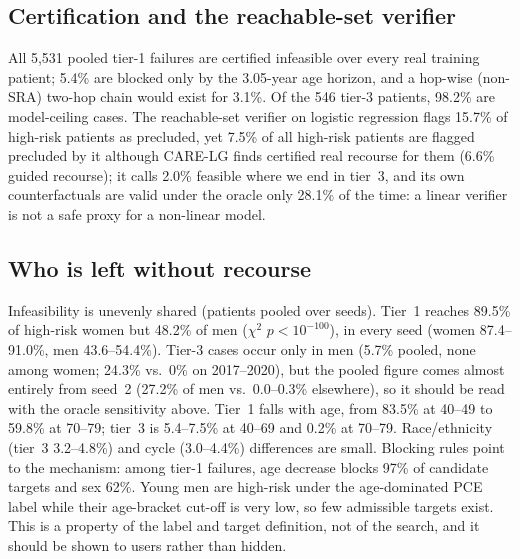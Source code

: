 \documentclass[conference]{IEEEtran}
\newcommand{\method}{CARE-LG}
\begin{document}
\subsection{Certification and the reachable-set verifier}
All 5,531 pooled tier-1 failures are certified infeasible over every real training patient; 5.4\% are blocked only by the 3.05-year age horizon, and a hop-wise (non-SRA) two-hop chain would exist for 3.1\%. Of the 546 tier-3 patients, 98.2\% are model-ceiling cases. The reachable-set verifier on logistic regression flags 15.7\% of high-risk patients as precluded, yet 7.5\% of all high-risk patients are flagged precluded by it although \method{} finds certified real recourse for them (6.6\% guided recourse); it calls 2.0\% feasible where we end in tier~3, and its own counterfactuals are valid under the oracle only 28.1\% of the time: a linear verifier is not a safe proxy for a non-linear model. %

\subsection{Who is left without recourse}
Infeasibility is unevenly shared (patients pooled over seeds). Tier~1 reaches 89.5\% of high-risk women but 48.2\% of men ($\chi^2$ $p<10^{-100}$), in every seed (women 87.4--91.0\%, men 43.6--54.4\%). Tier-3 cases occur only in men (5.7\% pooled, none among women; 24.3\% vs.\ 0\% on 2017--2020), but the pooled figure comes almost entirely from seed~2 (27.2\% of men vs.\ 0.0--0.3\% elsewhere), so it should be read with the oracle sensitivity above. Tier~1 falls with age, from 83.5\% at 40--49 to 59.8\% at 70--79; tier~3 is 5.4--7.5\% at 40--69 and 0.2\% at 70--79. Race/ethnicity (tier~3 3.2--4.8\%) and cycle (3.0--4.4\%) differences are small. Blocking rules point to the mechanism: among tier-1 failures, age decrease blocks 97\% of candidate targets and sex 62\%. Young men are high-risk under the age-dominated PCE label while their age-bracket cut-off is very low, so few admissible targets exist. This is a property of the label and target definition, not of the search, and it should be shown to users rather than hidden. %

\end{document}
